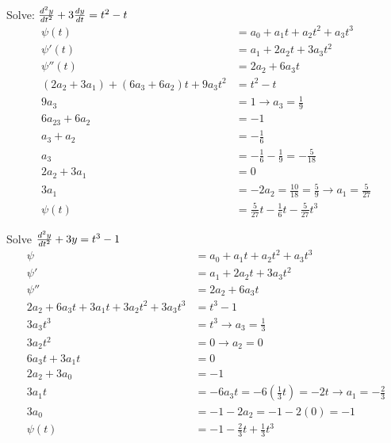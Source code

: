 \documentclass[12pt]{article}
\begin{document}
\begin{example} Solve: $\frac{d^2y}{dt^2} + 3\frac{dy}{dt} = t^2 - t$ $$\begin{aligned}
\psi(t) &= a_0 + a_1t + a_2t^2 + a_3t^3 \\ \psi'(t) &= a_1 + 2a_2t + 3a_3t^2 \\
\psi''(t) &= 2a_2 + 6a_3t \\ 
(2a_2 + 3a_1) + (6a_3 + 6a_2)t + 9a_3t^2 &= t^2 - t \\
9a_3 &= 1 \to a_3 = \frac{1}{9} \\
6a_23 + 6a_2 &= -1 \\ a_3 + a_2 &= -\frac{1}{6} \\ 
a_3 &= -\frac{1}{6} - \frac{1}{9} = -\frac{5}{18} \\ 
2a_2 + 3a_1 &= 0 \\
3a_1 &= -2a_2 = \frac{10}{18} = \frac{5}{9} \to a_1 = \frac{5}{27} \\ 
\psi(t) &= \frac{5}{27}t - \frac{1}{6}t - \frac{5}{27}t^3
\end{aligned} $$ \end{example} 

\begin{example} Solve $\frac{d^2y}{dt^2} + 3y = t^3 - 1$ $$\begin{aligned} 
\psi &= a_0 + a_1t + a_2t^2 + a_3t^3 \\ \psi' &= a_1 + 2a_2t + 3a_3t^2 \\ \psi'' &= 2a_2 + 6a_3t \\ 2a_2 + 6a_3t + 3a_1t + 3a_2t^2 + 3a_3t^3 &= t^3 - 1 \\ 3a_3t^3 &= t^3 \to a_3 = \frac{1}{3} \\ 3a_2t^2 &= 0 \to a_2 = 0 \\ 6a_3t + 3a_1t &= 0 \\ 2a_2 + 3a_0 &= -1 \\ 3a_1t &= -6a_3t = -6(\frac{1}{3}t) = -2t \to a_1 = -\frac{2}{3} \\ 3a_0 &= -1 - 2a_2 = -1 - 2(0) = -1 \\ \psi(t) &= -1 - \frac{2}{3}t + \frac{1}{3}t^3 \end{aligned} $$ \end{example} 
\end{document}
